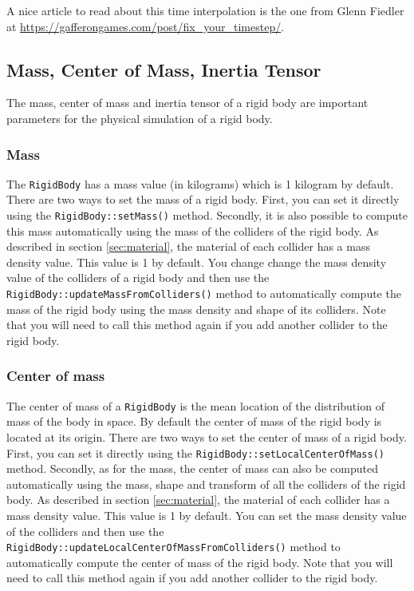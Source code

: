 \documentclass[a4paper,12pt]{article}
\begin{document}
    A nice article to read about this time interpolation is the one from Glenn Fiedler at \url{https://gafferongames.com/post/fix_your_timestep/}.

    \subsection{Mass, Center of Mass, Inertia Tensor}
    \label{sec:rigidbodymass}

    The mass, center of mass and inertia tensor of a rigid body are important parameters for the physical simulation of a rigid body.

    \subsubsection{Mass}

    The \texttt{RigidBody} has a mass value (in kilograms) which is 1 kilogram by default. There are two ways to set the mass of a rigid body. First, you
    can set it directly using the \texttt{RigidBody::setMass()} method. Secondly, it is also possible to compute this mass
    automatically using the mass of the colliders of the rigid body. As described in section \ref{sec:material}, the material of each collider has a 
    mass density value. This value is 1 by default. You change change the mass density value of the colliders of a rigid body and then use the
    \texttt{RigidBody::updateMassFromColliders()} method to automatically compute the mass of the rigid body using the mass density and shape of
    its colliders. Note that you will need to call this method again if you add another collider to the rigid body.

    \subsubsection{Center of mass}

    The center of mass of a \texttt{RigidBody} is the mean location of the distribution of mass of the body in space. By default the center of mass
    of the rigid body is located at its origin. There are two ways to set the center of mass of a rigid body. First, you can set it directly using the
    \texttt{RigidBody::setLocalCenterOfMass()} method. Secondly, as for the mass, the center of mass can also be computed automatically using the
    mass, shape and transform of all the colliders of the rigid body. As described in section \ref{sec:material}, the material of each collider has a
    mass density value. This value is 1 by default. You can set the mass density value of the colliders and then use the
    \texttt{RigidBody::updateLocalCenterOfMassFromColliders()} method to automatically compute the center of mass of the rigid body.
    Note that you will need to call this method again if you add another collider to the rigid body.
\end{document}
